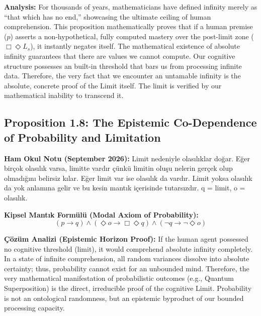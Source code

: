 \documentclass{article}
\begin{document}
\textbf{Analysis:} For thousands of years, mathematicians have defined infinity merely as ``that which has no end,'' showcasing the ultimate ceiling of human comprehension. This proposition mathematically proves that if a human premise (\(p\)) asserts a non-hypothetical, fully computed mastery over the post-limit zone (\(\Box \Diamond L_s\)), it instantly negates itself. The mathematical existence of absolute infinity guarantees that there are values we cannot compute. Our cognitive structure possesses an built-in threshold that bars us from processing infinite data. Therefore, the very fact that we encounter an untamable infinity is the absolute, concrete proof of the Limit itself. The limit is verified by our mathematical inability to transcend it.

\subsection{Proposition 1.8: The Epistemic Co-Dependence of Probability and Limitation}
\textbf{Ham Okul Notu (September 2026):} 
Limit nedeniyle olasılıklar doğar. Eğer birçok olasılık varsa, limitte vardır çünkü limitin oluşu nelerin gerçek olup olmadığını belirsiz kılar. Eğer limit var ise olasılık da vardır. Limit yoksa olasılık da yok anlamına gelir ve bu kesin mantık içerisinde tutarsızdır.
q = limit, o = olasılık.

\textbf{Kipsel Mantık Formülü (Modal Axiom of Probability):}
\[ (p \rightarrow q) \land (\Diamond o \rightarrow \Box\Diamond q) \land (\neg q \rightarrow \neg\Diamond o) \]

\textbf{Çözüm Analizi (Epistemic Horizon Proof):}
If the human agent possessed no cognitive threshold (limit), it would comprehend absolute infinity completely. In a state of infinite comprehension, all random variances dissolve into absolute certainty; thus, probability cannot exist for an unbounded mind. Therefore, the very mathematical manifestation of probabilistic outcomes (e.g., Quantum Superposition) is the direct, irreducible proof of the cognitive Limit. Probability is not an ontological randomness, but an epistemic byproduct of our bounded processing capacity.
\end{document}

